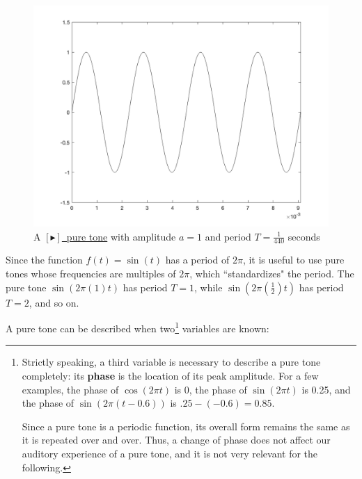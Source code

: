 \begin{figure}[h]
    \centering
    \includegraphics[scale=.15]{pure_tone_A4.png}
    \caption{A \href{https://drive.google.com/file/d/1Kkbf2dlfvdJgidkY80bJVJJ9kDVgS8sk/view?usp=sharing}{\color{blue} $[\blacktriangleright]$~pure tone} with amplitude $a = 1$ and period $T = \frac{1}{440}$ seconds}
    \label{fig:pure_tone}
\end{figure}

\par Since the function $f(t) = \sin(t)$ has a period of $2\pi$, it is useful to use pure tones whose frequencies are multiples of $2\pi$, which ``standardizes" the period. The pure tone $\sin(2\pi(1)t)$ has period $T = 1$, while $\sin(2\pi(\frac{1}{2})t)$ has period $T = 2$, and so on.

\newpage

\par \noindent A pure tone can be described when two\footnote{Strictly speaking, a third variable is necessary to describe a pure tone completely: its \textbf{phase} is the location of its peak amplitude. For a few examples, the phase of $\cos(2\pi t)$ is 0, the phase of $\sin(2\pi t)$ is 0.25, and the phase of $\sin(2\pi(t-0.6))$ is $.25-(-0.6) = 0.85$. \par Since a pure tone is a periodic function, its overall form remains the same as it is repeated over and over. Thus, a change of phase does not affect our auditory experience of a pure tone, and it is not very relevant for the following.} variables are known:\cite{Pierce}

